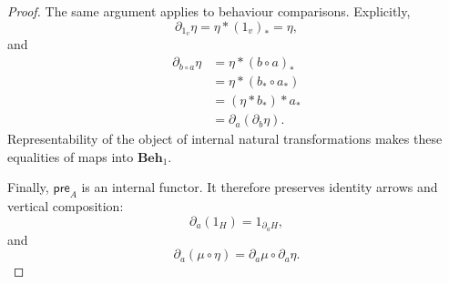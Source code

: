 \begin{proof}
    The same argument applies to behaviour comparisons. Explicitly,
    \[
        \partial_{1_v}\eta
        =
        \eta\ast(1_v)_*
        =
        \eta,
    \]
    and
    \[
        \begin{aligned}
            \partial_{b\circ a}\eta
            &=
            \eta\ast(b\circ a)_*
            \\
            &=
            \eta\ast(b_*\circ a_*)
            \\
            &=
            (\eta\ast b_*)\ast a_*
            \\
            &=
            \partial_a(\partial_b\eta).
        \end{aligned}
    \]
    Representability of the object of internal natural transformations
    makes these equalities of maps into \(\mathbf{Beh}_1\).

    Finally, \(\mathsf{pre}_A\) is an internal functor. It therefore
    preserves identity arrows and vertical composition:
    \[
        \partial_a(1_H)
        =
        1_{\partial_aH},
    \]
    and
    \[
        \partial_a(\mu\circ\eta)
        =
        \partial_a\mu\circ\partial_a\eta.
    \]
\end{proof}


